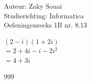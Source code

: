 \documentclass[a4paper]{article}
\begin{document}
\noindent \large Auteur: Zaky Souai \\
\noindent \large Studierichting: Informatica\\
\noindent \large Oefeningenreeks 1B nr. 8.13\\

\medskip

\normalsize

    $(2 - i) (1 + 2i) $ \\
	
	$= 2 + 4i - i - 2i^2 $ \\	
	
	$=  4 + 3i $ \\	
\begin{thebibliography}{999}
\end{thebibliography}
\end{document}
